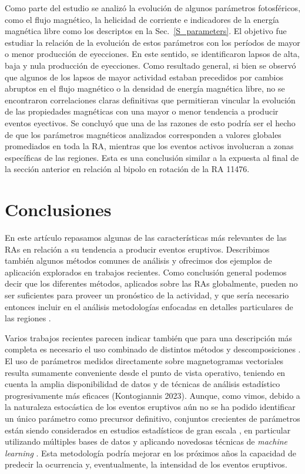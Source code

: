 \documentclass[baaa]{baaa}
\begin{document}
Como parte del estudio se analizó la evolución de algunos parámetros fotosféricos, como el flujo magnético, la helicidad de corriente e indicadores de la energía magnética libre como los descriptos en la Sec.~\ref{S_parameters}. El objetivo fue estudiar la relación de la evolución de estos parámetros con los períodos de mayor o menor producción de eyecciones. En este sentido, se identificaron lapsos de alta, baja y nula producción de eyecciones. Como resultado general, si bien se observó que algunos de los lapsos de mayor actividad estaban precedidos por cambios abruptos en el flujo magnético o la densidad de energía magnética libre, no se encontraron correlaciones claras definitivas que permitieran vincular la evolución de las propiedades magnéticas con una mayor o menor tendencia a producir eventos eyectivos. Se concluyó que una de las razones de esto podría ser el hecho de que los parámetros magnéticos analizados corresponden a valores globales promediados en toda la RA, mientras que los eventos activos involucran a zonas específicas de las regiones. Esta es una conclusión similar a la expuesta al final de la sección anterior en relación al bipolo en rotación de la RA 11476.

\section{Conclusiones}
\label{S_conclusion}

En este artículo repasamos algunas de las características más relevantes de las RAs en relación a su tendencia a producir eventos eruptivos. Describimos también algunos métodos comunes de análisis y ofrecimos dos ejemplos de aplicación explorados en trabajos recientes. Como conclusión general podemos decir que los diferentes métodos, aplicados sobre las RAs globalmente, pueden no ser suficientes para proveer un pronóstico de la actividad, y que sería necesario entonces incluir en el análisis metodologías enfocadas en detalles particulares de las regiones \citep[ver p. ej.,][]{ji2023}. 

Varios trabajos recientes parecen indicar también que para una descripción más completa es necesario el uso combinado de distintos métodos y descomposiciones \citep{thalmann2021, liokati2022, liu2023}. El uso de parámetros medidos directamente sobre magnetogramas vectoriales resulta sumamente conveniente desde el punto de vista operativo, teniendo en cuenta la amplia disponibilidad de datos y de técnicas de análisis estadístico progresivamente más eficaces (Kontogiannis 2023). Aunque, como vimos, debido a la naturaleza estocástica de los eventos eruptivos aún no se ha podido identificar un único parámetro como precursor definitivo, conjuntos crecientes de parámetros están siendo considerados en estudios estadísticos de gran escala \citep{leka2019}, en particular utilizando múltiples bases de datos y aplicando novedosas técnicas de {\sl machine learning} \citep{bobra2016,nishizuka2017,georgoulis2021}. Esta metodología podría mejorar en los próximos años la capacidad de predecir la ocurrencia y, eventualmente, la intensidad de los eventos eruptivos.
\end{document}

